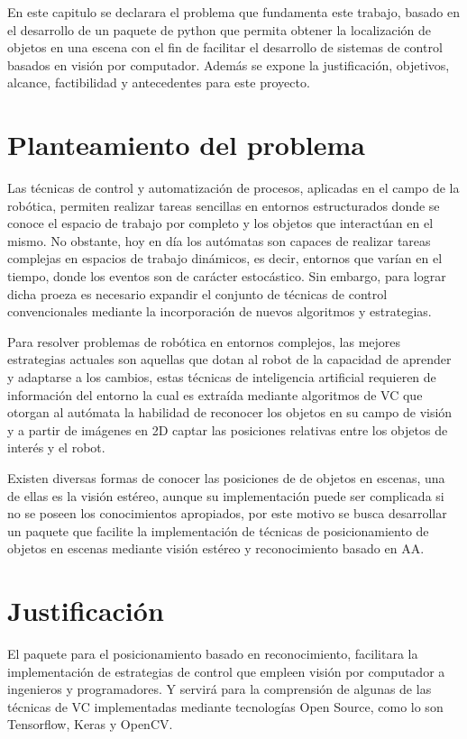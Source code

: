 En este capitulo se declarara el problema que fundamenta este trabajo, basado en el desarrollo de un paquete de python que permita obtener la localización de objetos en una escena con el fin de facilitar el desarrollo de sistemas de control basados en visión por computador. Además se expone la justificación, objetivos, alcance, factibilidad y antecedentes para este proyecto.

\section{Planteamiento del problema}
Las técnicas de control y automatización de procesos, aplicadas en el campo de la robótica, permiten realizar tareas sencillas en entornos estructurados donde se conoce el espacio de trabajo por completo y los objetos que interactúan en el mismo. No obstante, hoy en día los autómatas son capaces de realizar tareas complejas en espacios de trabajo dinámicos, es decir, entornos que varían en el tiempo, donde los eventos son de carácter estocástico. Sin embargo, para lograr dicha proeza es necesario expandir el conjunto de técnicas de control convencionales mediante la incorporación de nuevos algoritmos y estrategias.  

Para resolver problemas de robótica en entornos complejos, las mejores estrategias actuales son aquellas que dotan al robot de la capacidad de aprender y adaptarse a los cambios, estas técnicas de inteligencia artificial requieren de información del entorno la cual es extraída mediante algoritmos de VC que otorgan al autómata la habilidad de reconocer los objetos en su campo de visión y a partir de imágenes en 2D captar las posiciones relativas entre los objetos de interés y el robot. 

Existen diversas formas de conocer las posiciones de de objetos en escenas, una de ellas es la visión estéreo, aunque su implementación puede ser complicada si no se poseen los conocimientos apropiados, por este motivo se busca desarrollar un paquete que facilite la implementación de técnicas de posicionamiento de objetos en escenas mediante visión estéreo y reconocimiento basado en AA.
\section{Justificación}
El paquete para el posicionamiento basado en reconocimiento, facilitara la implementación de estrategias de control que empleen visión por computador a ingenieros y programadores. Y servirá para la comprensión de algunas de las técnicas de VC implementadas mediante tecnologías Open Source, como lo son Tensorflow, Keras y OpenCV.

